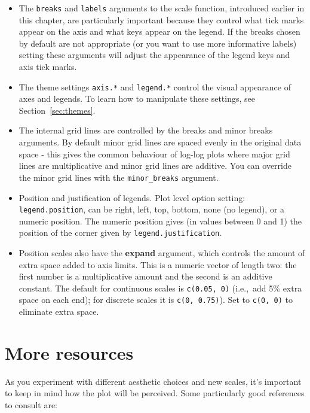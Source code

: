 \begin{itemize}
  \item The {\tt breaks} and {\tt labels} arguments to the scale function, introduced earlier in this chapter, are particularly important because they control what tick marks appear on the axis and what keys appear on the legend.  If the breaks chosen by default are not appropriate (or you want to use more informative labels) setting these arguments will adjust the appearance of the legend keys and axis tick marks.  
  
  \item The theme settings {\tt axis.*} and {\tt legend.*} control the visual appearance of axes and legends.  To learn how to manipulate these settings, see Section~\ref{sec:themes}.

  \item The internal grid lines are controlled by the breaks and minor breaks arguments.  By default minor grid lines are spaced evenly in the original data space - this gives the common behaviour of log-log plots where major grid lines are multiplicative and minor grid lines are additive.  You can override the minor grid lines with the {\tt minor\_breaks} argument.


  \item Position and justification of legends.  Plot level option setting: {\tt legend.position}, can be right, left, top, bottom, none (no legend), or a numeric position.  The numeric position gives (in values between 0 and 1) the position of the corner given by {\tt legend.justification}.  
  
  \item Position scales also have the {\bf expand} argument, which controls the amount of extra space added to axis limits.  This is a numeric vector of length two: the first number is a multiplicative amount and the second is an additive constant.  The default for continuous scales is {\tt c(0.05, 0)} (i.e.,\ add 5\% extra space on each end); for discrete scales it is {\tt c(0, 0.75)}).  Set to {\tt c(0, 0)} to eliminate extra space.
  
\end{itemize}

\section{More resources}
\label{sec:scale_resources}

As you experiment with different aesthetic choices and new scales, it's important to keep in mind how the plot will be perceived.   Some particularly good references to consult are:

